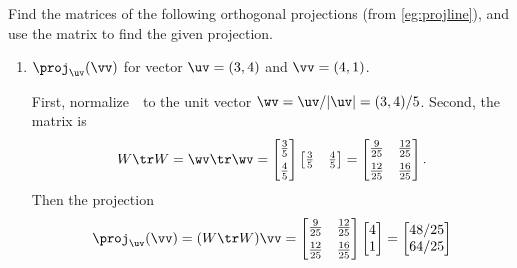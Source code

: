 \begin{example} \label{eg:projlinem}
Find the matrices of the following orthogonal projections (from \cref{eg:projline}), and use the matrix to find the given projection.
\begin{enumerate}
\item \(\proj_\uv(\vv)\) for vector \(\uv=(3,4)\) and \(\vv=(4,1)\).
\begin{solution} 
First, normalize~\uv\ to the unit vector \(\wv=\uv/|\uv|=(3,4)/5\). Second, the matrix is
\begin{equation*}
W\tr W=\wv\tr\wv=\begin{bmatrix} \frac35\\[1ex] \frac45 \end{bmatrix}\begin{bmatrix} \frac35&\frac45 \end{bmatrix}
=\begin{bmatrix} \frac9{25}&\frac{12}{25}\\[1ex]
\frac{12}{25}&\frac{16}{25} \end{bmatrix}.
\end{equation*}
Then the projection
\begin{equation*}
\proj_\uv(\vv) =(W\tr W)\vv
=\begin{bmatrix} \frac9{25}&\frac{12}{25}\\[1ex]
\frac{12}{25}&\frac{16}{25} \end{bmatrix}\begin{bmatrix} 4\\1 \end{bmatrix}
=\begin{bmatrix} 48/25\\64/25 \end{bmatrix}
\end{equation*}
\end{solution}


\end{enumerate}
\end{example}

